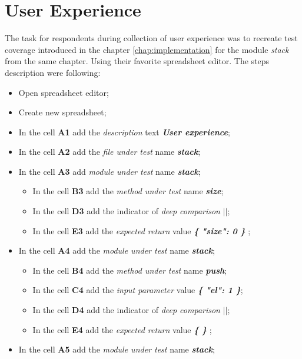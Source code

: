 \chapter{User Experience}
The task for respondents during collection of user experience was to recreate test coverage introduced in the chapter \ref{chap:implementation} for the module \textit{stack} from the same chapter. Using their favorite spreadsheet editor.
The steps description were following:
\begin{itemize}
	\item Open spreadsheet editor;
	\item Create new spreadsheet;
	\item In the cell \textbf{A1} add the \textit{description} text\textit{ \textbf{User experience}};
	\item In the cell \textbf{A2} add the \textit{file under test} name \textit{\textbf{stack}};
	\item In the cell \textbf{A3} add  \textit{module under test} name \textit{\textbf{stack}};
	\begin{itemize}
		\item In the cell \textbf{B3} add the \textit{method under test} name \textit{\textbf{size}};
		\item In the cell \textbf{D3} add the indicator of \textit{deep comparison}\textit{ \textbf{$||$}};
		\item In the cell \textbf{E3} add the \textit{expected return} value \textit{\textbf{ \{ "size": 0 \} }};
	\end{itemize}
	\item In the cell \textbf{A4} add the \textit{module under test} name\textit{ \textbf{stack}};
	\begin{itemize}
		\item In the cell \textbf{B4} add the \textit{method under test} name  \textit{\textbf{push}};
		\item In the cell \textbf{C4} add the \textit{input parameter} value \textit{\textbf{ \{ "el": 1 \}}};
		\item In the cell \textbf{D4} add the indicator of \textit{deep comparison}\textit{ \textbf{$||$}};
		\item In the cell \textbf{E4} add the \textit{expected return} value\textit{ \textbf{ \{ \} }};
	\end{itemize}
	\item In the cell \textbf{A5} add the  \textit{module under test} name \textit{ \textbf{stack}};
	\begin{itemize}

\end{itemize}
\end{itemize}
